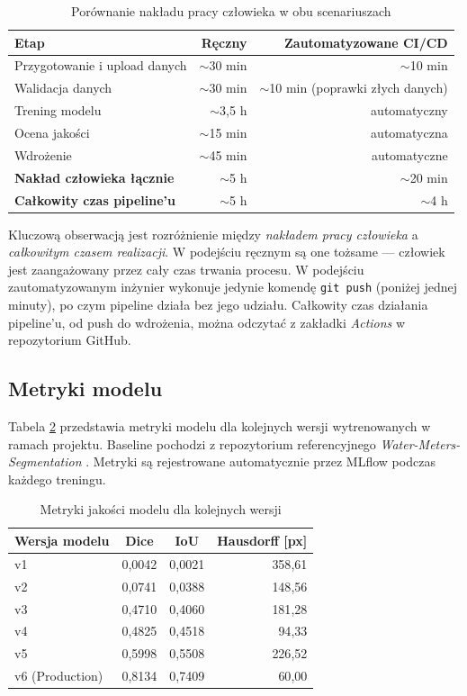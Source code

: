 \begin{table}[H]
\centering
\caption{Porównanie nakładu pracy człowieka w obu scenariuszach}
\label{tab:czasy}
\begin{tabular}{|l|r|r|}
\hline
\textbf{Etap} & \textbf{Ręczny} & \textbf{Zautomatyzowane CI/CD} \\
\hline
Przygotowanie i upload danych & $\sim$30 min & $\sim$10 min \\
Walidacja danych & $\sim$30 min & $\sim$10 min (poprawki złych danych) \\
Trening modelu & $\sim$3,5 h & automatyczny \\
Ocena jakości & $\sim$15 min & automatyczna \\
Wdrożenie & $\sim$45 min & automatyczne \\
\hline
\textbf{Nakład człowieka łącznie} & $\sim$5 h & $\sim$20 min \\
\textbf{Całkowity czas pipeline'u} & $\sim$5 h & $\sim$4 h \\
\hline
\end{tabular}
\end{table}

Kluczową obserwacją jest rozróżnienie między \textit{nakładem pracy człowieka} a \textit{całkowitym czasem realizacji}. W podejściu ręcznym są one tożsame --- człowiek jest zaangażowany przez cały czas trwania procesu. W podejściu zautomatyzowanym inżynier wykonuje jedynie komendę \texttt{git push} (poniżej jednej minuty), po czym pipeline działa bez jego udziału. Całkowity czas działania pipeline'u, od push do wdrożenia, można odczytać z zakładki \textit{Actions} w repozytorium GitHub.

\subsection{Metryki modelu}

Tabela \ref{tab:metryki} przedstawia metryki modelu dla kolejnych wersji wytrenowanych w ramach projektu. Baseline pochodzi z repozytorium referencyjnego \textit{Water-Meters-Segmentation} \cite{kaggle_water_meters}. Metryki są rejestrowane automatycznie przez MLflow \cite{zaharia2018mlflow} podczas każdego treningu.

\begin{table}[H]
\centering
\caption{Metryki jakości modelu dla kolejnych wersji}
\label{tab:metryki}
\begin{tabular}{|l|c|c|r|}
\hline
\textbf{Wersja modelu} & \textbf{Dice} & \textbf{IoU} & \textbf{Hausdorff [px]} \\
\hline
v1  & 0{,}0042 & 0{,}0021 & 358{,}61 \\
v2  & 0{,}0741 & 0{,}0388 & 148{,}56 \\
v3  & 0{,}4710 & 0{,}4060 & 181{,}28 \\
v4  & 0{,}4825 & 0{,}4518 &  94{,}33 \\
v5  & 0{,}5998 & 0{,}5508 & 226{,}52 \\
v6 (Production)  & 0{,}8134 & 0{,}7409 &  60{,}00 \\
\hline
\end{tabular}
\end{table}

